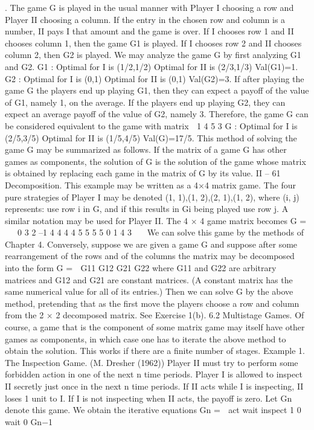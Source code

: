 .
The game G is played in the usual manner with Player I choosing a row and Player II
choosing a column. If the entry in the chosen row and column is a number, II pays I that
amount and the game is over. If I chooses row 1 and II chooses column 1, then the game
G1 is played. If I chooses row 2 and II chooses column 2, then G2 is played.
We may analyze the game G by first analyzing G1 and G2.
G1 : Optimal for I is (1/2,1/2)
Optimal for II is (2/3,1/3)
Val(G1)=1.
G2 : Optimal for I is (0,1)
Optimal for II is (0,1)
Val(G2)=3.
If after playing the game G the players end up playing G1, then they can expect a payoff
of the value of G1, namely 1, on the average. If the players end up playing G2, they can
expect an average payoff of the value of G2, namely 3. Therefore, the game G can be
considered equivalent to the game with matrix
 1 4
5 3
G :
Optimal for I is (2/5,3/5)
Optimal for II is (1/5,4/5)
Val(G)=17/5.
This method of solving the game G may be summarized as follows. If the matrix of
a game G has other games as components, the solution of G is the solution of the game
whose matrix is obtained by replacing each game in the matrix of G by its value.
II – 61
Decomposition. This example may be written as a 4×4 matrix game. The four pure
strategies of Player I may be denoted {(1, 1),(1, 2),(2, 1),(1, 2)}, where (i, j) represents:
use row i in G, and if this results in Gi being played use row j. A similar notation may
be used for Player II. The 4 × 4 game matrix becomes
G =
⎛
⎜⎝
0 3
2 –1
4 4
4 4
5 5
5 5
0 1
4 3
⎞
⎟⎠
We can solve this game by the methods of Chapter 4.
Conversely, suppose we are given a game G and suppose after some rearrangement of
the rows and of the columns the matrix may be decomposed into the form
G =
 G11 G12
G21 G22
where G11 and G22 are arbitrary matrices and G12 and G21 are constant matrices. (A
constant matrix has the same numerical value for all of its entries.) Then we can solve
G by the above method, pretending that as the first move the players choose a row and
column from the 2 × 2 decomposed matrix. See Exercise 1(b).
6.2 Multistage Games. Of course, a game that is the component of some matrix
game may itself have other games as components, in which case one has to iterate the
above method to obtain the solution. This works if there are a finite number of stages.
Example 1. The Inspection Game. (M. Dresher (1962)) Player II must try to perform
some forbidden action in one of the next n time periods. Player I is allowed to inspect II
secretly just once in the next n time periods. If II acts while I is inspecting, II loses 1 unit
to I. If I is not inspecting when II acts, the payoff is zero.
Let Gn denote this game. We obtain the iterative equations
Gn =

act wait
inspect 1 0
wait 0 Gn−1

